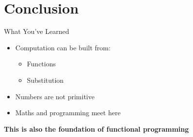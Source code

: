 \documentclass{beamer}
\begin{document}
\section{Conclusion}
\begin{frame}{What You've Learned}
  \begin{itemize}
    \item Computation can be built from:
      \begin{itemize}\item Functions\item Substitution\end{itemize}
    \item Numbers are not primitive
    \item Maths and programming meet here
  \end{itemize}
  \textbf{This is also the foundation of functional programming}
\end{frame}
\end{document}
